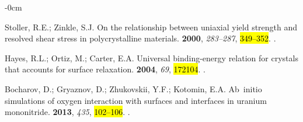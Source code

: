 \documentclass[applsci,article,accept,pdftex,moreauthors]{Definitions/mdpi}
\newcommand{\?}{\stackrel{?}{=}}
\begin{document}
\begin{adjustwidth}{-\extralength}{0cm}
\begin{thebibliography}{999}
Stoller, R.E.; Zinkle, S.J.
\newblock On the relationship between uniaxial yield strength and resolved
  shear stress in polycrystalline materials.
 {\bf 2000}, {\em 283--287}, \hl{349--352}.
.

Hayes, R.L.; Ortiz, M.; Carter, E.A.
\newblock Universal binding-energy relation for crystals that accounts for
  surface relaxation.
 {\bf
  2004}, {\em 69}, \hl{172104}.
.

Bocharov, D.; Gryaznov, D.; Zhukovskii, Y.F.; Kotomin, E.A.
\newblock Ab~initio simulations of oxygen interaction with surfaces and
  interfaces in uranium mononitride.
 {\bf 2013}, {\em 435}, \hl{102--106}.
.

\end{thebibliography}

\PublishersNote{}


\end{adjustwidth}
\end{document}

